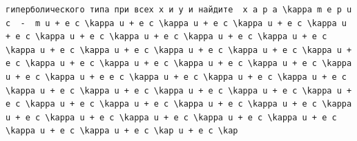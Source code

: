 \documentclass[
  ukrainian,
]{article}
\begin{document}
\begin{verbatim}
гиперболического типа при всех x и y и найдите  x a p a \kappa m e p u c  -  m u + e c \kappa u + e c \kappa u + e c \kappa u + e c \kappa u + e c \kappa u + e c \kappa u + e c \kappa u + e c \kappa u + e c \kappa u + e c \kappa u + e c \kappa u + e c \kappa u + e c \kappa u + e c \kappa u + e c \kappa u + e c \kappa u + e c \kappa u + e c \kappa u + e c \kappa u + e e c \kappa u + e c \kappa u + e c \kappa u + e c \kappa u + e c \kappa u + e c \kappa u + e c \kappa u + e c \kappa u + e c \kappa u + e c \kappa u + e c \kappa u + e c \kappa u + e c \kappa u + e c \kappa u + e c \kappa u + e c \kappa u + e c \kappa u + e c \kappa u + e c \kappa u + e c \kap u + e c \kap
\end{verbatim}

\begin{verbatim}

\end{verbatim}
\end{document}
